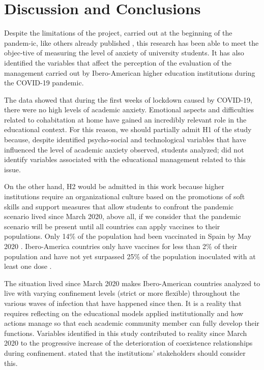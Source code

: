 \documentclass[english]{textolivre}
\begin{document}
\section{Discussion and Conclusions}

Despite the limitations of the project, carried out at the beginning of the pandem-ic, like others already published \textcite{perez_escoda_digital_2021,coronado_environmental_2021}, this research has been able to meet the objec-tive of measuring the level of anxiety of university students. It has also identified the variables that affect the perception of the evaluation of the management carried out by Ibero-American higher education institutions during the COVID-19 pandemic.

The data showed that during the first weeks of lockdown caused by COVID-19, there were no high levels of academic anxiety. Emotional aspects and difficulties related to cohabitation at home have gained an incredibly relevant role in the educational context. For this reason, we should partially admit H1 of the study because, despite identified psycho-social and technological variables that have influenced the level of academic anxiety observed, students analyzed; did not identify variables associated with the educational management related to this issue.

On the other hand, H2 would be admitted in this work because higher institutions require an organizational culture based on the promotions of soft skills and support measures that allow students to confront the pandemic scenario lived since March 2020, above all, if we consider that the pandemic scenario will be present until all countries can apply vaccines to their populations. Only 14\% of the population had been vaccinated in Spain by May 2020 \cite{ministerio_de_sanidad_de_espana_vacuna_2021}. Ibero-America countries only have vaccines for less than 2\% of their population \cite{chevalier_cuantas_2021} and have not yet surpassed 25\% of the population inoculated with at least one dose \cite{pasquali_asi_2021}.

The situation lived since March 2020 makes Ibero-American countries analyzed to live with varying confinement levels (strict or more flexible) throughout the various waves of infection that have happened since then. It is a reality that requires reflecting on the educational models applied institutionally and how actions manage so that each academic community member can fully develop their functions. Variables identified in this study contributed to reality since March 2020 to the progressive increase of the deterioration of coexistence relationships during confinement. \textcite{florencia_vela_relajacion_2020} stated that the institutions' stakeholders should consider this.
\end{document}
